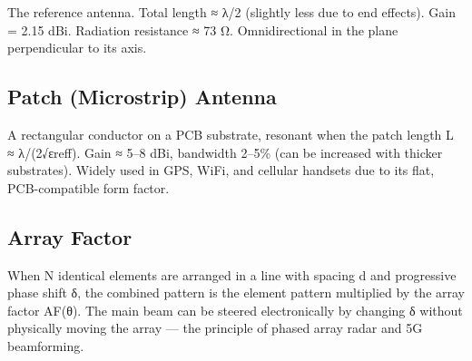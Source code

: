 				

The reference antenna. Total length ≈ λ/2 (slightly less due to end effects). Gain = 2.15 dBi. Radiation resistance ≈ 73 Ω. Omnidirectional in the plane perpendicular to its axis.


				

\subsection{Patch (Microstrip) Antenna}

				

A rectangular conductor on a PCB substrate, resonant when the patch length L ≈ λ/(2√εreff). Gain ≈ 5–8 dBi, bandwidth 2–5\% (can be increased with thicker substrates). Widely used in GPS, WiFi, and cellular handsets due to its flat, PCB-compatible form factor.

				

\subsection{Array Factor}

				

When N identical elements are arranged in a line with spacing d and progressive phase shift δ, the combined pattern is the element pattern multiplied by the array factor AF(θ). The main beam can be steered electronically by changing δ without physically moving the array — the principle of phased array radar and 5G beamforming.



